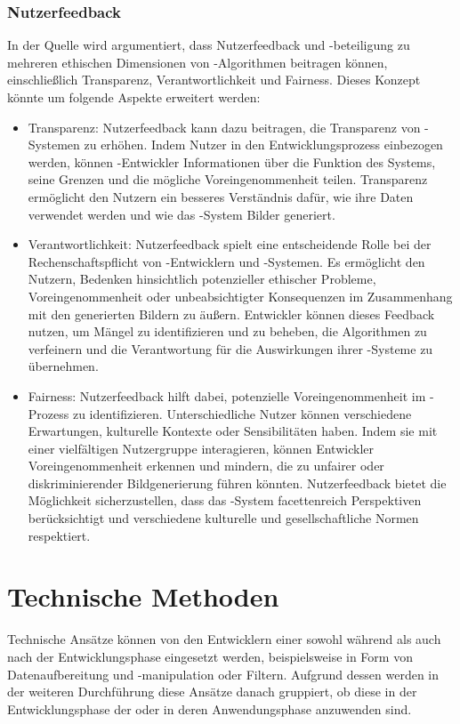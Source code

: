 \documentclass[hidelinks,12pt]{report}
\begin{document}
\subsubsection{Nutzerfeedback}
In der Quelle \cite{Mittelstadt} wird argumentiert, dass Nutzerfeedback und -beteiligung zu mehreren ethischen Dimensionen von -Algorithmen beitragen können, einschließlich Transparenz, Verantwortlichkeit und Fairness. Dieses Konzept könnte um folgende Aspekte erweitert werden:
\\
\begin{itemize}
	\item Transparenz: Nutzerfeedback kann dazu beitragen, die Transparenz von -Systemen zu erhöhen. Indem Nutzer in den Entwicklungsprozess einbezogen werden, können -Entwickler Informationen über die Funktion des Systems, seine Grenzen und die mögliche Voreingenommenheit teilen. Transparenz ermöglicht den Nutzern ein besseres Verständnis dafür, wie ihre Daten verwendet werden und wie das -System Bilder generiert.
	\item Verantwortlichkeit: Nutzerfeedback spielt eine entscheidende Rolle bei der Rechenschaftspflicht von -Entwicklern und -Systemen. Es ermöglicht den Nutzern, Bedenken hinsichtlich potenzieller ethischer Probleme, Voreingenommenheit oder unbeabsichtigter Konsequenzen im Zusammenhang mit den generierten Bildern zu äußern. Entwickler können dieses Feedback nutzen, um Mängel zu identifizieren und zu beheben, die Algorithmen zu verfeinern und die Verantwortung für die Auswirkungen ihrer -Systeme zu übernehmen.
	\item Fairness: Nutzerfeedback hilft dabei, potenzielle Voreingenommenheit im -Prozess zu identifizieren. Unterschiedliche Nutzer können verschiedene Erwartungen, kulturelle Kontexte oder Sensibilitäten haben. Indem sie mit einer vielfältigen Nutzergruppe interagieren, können Entwickler Voreingenommenheit erkennen und mindern, die zu unfairer oder diskriminierender Bildgenerierung führen könnten. Nutzerfeedback bietet die Möglichkeit sicherzustellen, dass das -System facettenreich Perspektiven berücksichtigt und verschiedene kulturelle und gesellschaftliche Normen respektiert.
\end{itemize}

\section{Technische Methoden}
Technische Ansätze können von den Entwicklern einer  sowohl während als auch nach der Entwicklungsphase eingesetzt werden, beispielsweise in Form von Datenaufbereitung und -manipulation oder Filtern. Aufgrund dessen werden in der weiteren Durchführung diese Ansätze danach gruppiert, ob diese in der Entwicklungsphase der  oder in deren Anwendungsphase anzuwenden sind.
\end{document}
